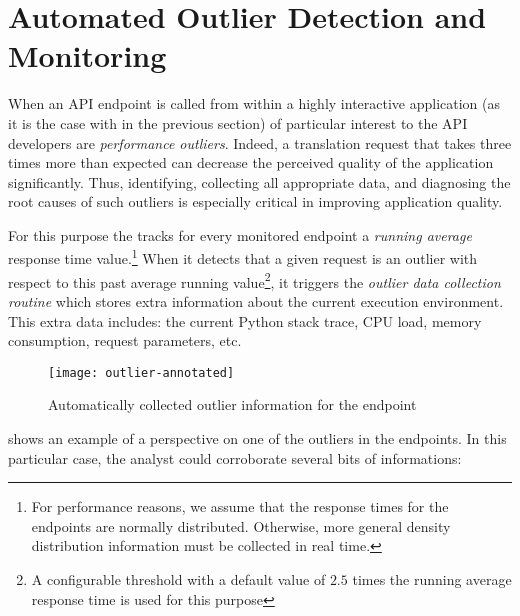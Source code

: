 
  \section{Automated Outlier Detection and Monitoring}
  \label{sec:outliers}
  
  When an API endpoint is called from within a highly interactive application 
    (as it is the case with \epTranslationsColor in the previous section) 
  of particular interest to the API developers are {\em performance outliers}.   
  Indeed, a translation request that takes three times more than expected can   decrease the perceived quality of the application significantly. 
  Thus, identifying, collecting all appropriate data, and diagnosing the root   causes of such outliers is especially critical in improving application quality. 
    
  For this purpose the \tool tracks for every monitored endpoint a {\em running average} response time value.\footnote{
    For performance reasons, we assume that the response times for the endpoints are normally distributed. 
    Otherwise, more general density distribution information must be collected in real time.}
  When it detects that a given request is an outlier with respect to this past average running value\footnote{A configurable threshold with a default value of $2.5$ times the running average response time is used for this purpose}, it triggers the {\em outlier data collection routine} which stores extra information about the current execution environment. This extra data includes: the current Python stack trace, CPU load, memory consumption, request parameters, etc. 

  \begin{figure}[h!]
    \centering
    \texttt{[image: outlier-annotated]}
    \caption{Automatically collected outlier information for the \epTranslationsColor endpoint}
    \label{fig:stack}
  \end{figure}
  
 shows an example of a   perspective on one of the outliers in the \epTranslationsColor endpoints. In this particular case, the analyst could corroborate several bits of informations: 

